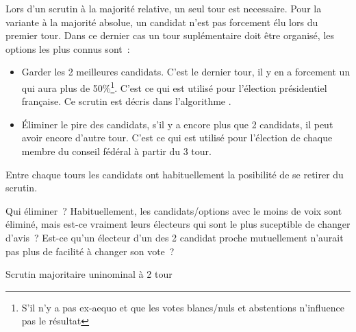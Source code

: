 \documentclass[../report]{subfiles}
\begin{document}
  Lors d'un scrutin à la majorité relative, un seul tour est necessaire.
  Pour la variante à la majorité absolue, un candidat n'est pas forcement élu lors du
  premier tour. Dans ce dernier cas un tour suplémentaire doit être organisé, les options
  les plus connus sont~: 
  \begin{itemize}
    \item Garder les 2 meilleures candidats. C'est le dernier tour, il y en a forcement un 
      qui aura plus de 50\%\footnote{S'il n'y a pas ex-aequo et que les votes blancs/nuls 
      et abstentions n'influence pas le résultat}. C'est ce qui est utilisé pour l'élection
      présidentiel française. Ce scrutin est décris dans l'algorithme .
    \item Éliminer le pire des candidats, s'il y a encore plus que 2 candidats, il peut avoir
      encore d'autre tour. C'est ce qui est utilisé pour l'élection de chaque membre du
      conseil fédéral à partir du 3 tour.
  \end{itemize}

  Entre chaque tours les candidats ont habituellement la posibilité de se retirer du scrutin.
  
  \begin{nota}{Qui éliminer~?}
    Habituellement, les candidats/options avec le moins de voix sont éliminé, mais
    est-ce vraiment leurs électeurs qui sont le plus suceptible de changer d'avis~?
    Est-ce qu'un électeur d'un des 2 candidat proche mutuellement n'aurait pas plus
    de facilité à changer son vote~?
  \end{nota}

  \begin{algorithm}
    \caption{Scrutin majoritaire uninominal à 2 tour}%
    \label{scrutin:maj-uni-2t}
    \begin{algorithmic}[1]
      \ENDFOR{}
      \ENDIF{}
      \STATE{}
      \ENDFOR{}
      \ELSE{}
      \ENDIF{}
    \end{algorithmic}
  \end{algorithm}
\end{document}
